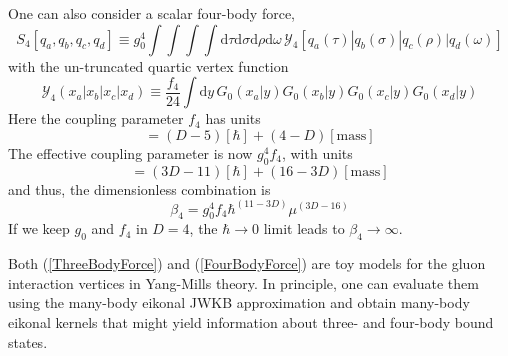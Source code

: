 One can also consider a scalar four-body force,
\begin{equation}
	S_{4}[q_{a}, q_{b}, q_{c}, q_{d}] \equiv g_{0}^{4} \int \int \int \int \mathrm{d}\tau \mathrm{d}\sigma \mathrm{d}\rho \mathrm{d}\omega \, \mathcal{Y}_{4}[q_{a}(\tau) | q_{b}(\sigma) | q_{c}(\rho) | q_{d}(\omega)] \label{FourBodyForce}
\end{equation}
with the un-truncated quartic vertex function
\begin{equation}
	\mathcal{Y}_{4}(x_{a}|x_{b}|x_{c}|x_{d}) \equiv \frac{f_{4}}{24} \int \mathrm{d}y \, G_{0}(x_{a}|y) G_{0}(x_{b}|y) G_{0}(x_{c}|y) G_{0}(x_{d}|y)
\end{equation}
Here the coupling parameter $f_{4}$ has units
\begin{equation}
	[f_{4}] = (D - 5) [\hbar] + (4 - D) [\text{mass}]
\end{equation}
The effective coupling parameter is now $g_{0}^{4} f_{4}$, with units
\begin{equation}
	[g_{0}^{4} f_{4}] = (3D - 11) [\hbar] + (16 - 3D) [\text{mass}]
\end{equation}
and thus, the dimensionless combination is
\begin{equation}
	\beta_{4} = g_{0}^{4} f_{4} \hbar^{(11 - 3D)} \mu^{(3D - 16)}
\end{equation}
If we keep $g_{0}$ and $f_{4}$ in $D = 4$, the $\hbar \rightarrow 0$ limit leads to $\beta_{4} \rightarrow \infty$.

Both (\ref{ThreeBodyForce}) and (\ref{FourBodyForce}) are toy models for the gluon interaction vertices in Yang-Mills theory. In principle, one can evaluate them using the many-body eikonal JWKB approximation and obtain many-body eikonal kernels that might yield information about three- and four-body bound states.
